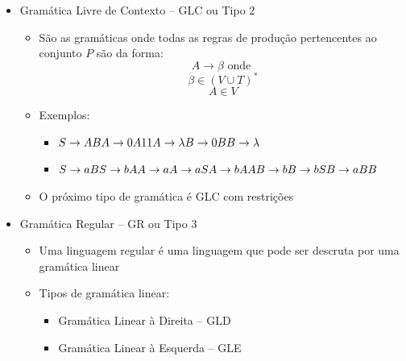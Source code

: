 \documentclass[12pt]{article}
\begin{document}
\begin{itemize}
\begin{itemize}
\begin{itemize}
            Gera a linguagem: $L(G) = \{a^nb^nc^n|n\geq 0\}$
        \end{itemize}
        \item Gramática Livre de Contexto -- GLC ou Tipo 2
        \begin{itemize}
            \item São as gramáticas onde todas as regras de produção pertencentes 
            ao conjunto $P$ são da forma:
            \[A \rightarrow \beta \text{ onde } \]
            \[\beta \in (V\cup T)^*\]
            \[A \in V\]
            \item Exemplos:
            \begin{itemize}
                \item \(S \rightarrow AB \\
                    A \rightarrow 0A11 \\
                    A \rightarrow \lambda \\
                    B \rightarrow 0B \\
                    B \rightarrow \lambda\)
                \item \(S \rightarrow aB \\
                    S \rightarrow bA \\
                    A \rightarrow a \\
                    A \rightarrow aS \\
                    A \rightarrow bAA \\
                    B \rightarrow b \\
                    B \rightarrow bS \\
                    B \rightarrow aBB\)
            \end{itemize}
            \item O próximo tipo de gramática é GLC com restrições
        \end{itemize}
        \item Gramática Regular -- GR ou Tipo 3
        \begin{itemize}
            \item Uma linguagem regular é uma linguagem que pode ser descruta 
            por uma gramática linear
            \item Tipos de gramática linear:
            \begin{itemize}
                \item Gramática Linear à Direita -- GLD
                \item Gramática Linear à Esquerda -- GLE

\end{itemize}
\end{itemize}
\end{itemize}
\end{itemize}
\end{document}
